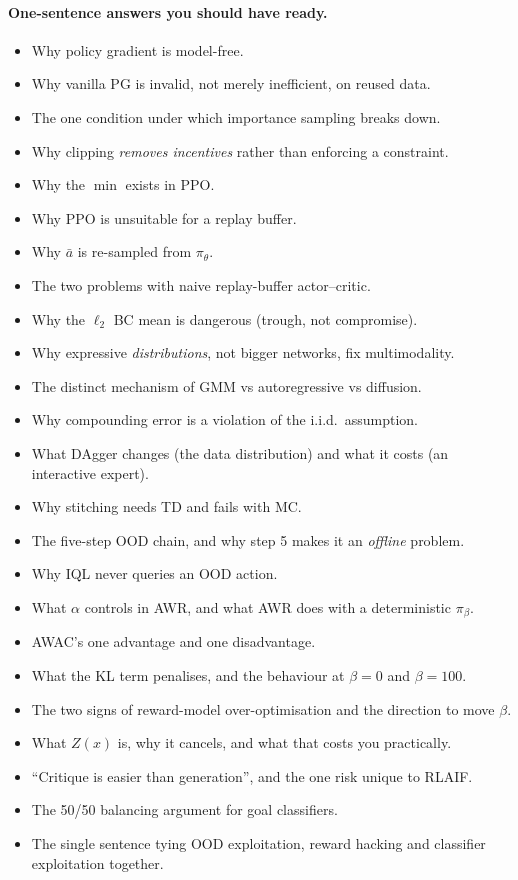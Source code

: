 \documentclass[11pt,a4paper]{article}
\begin{document}
\paragraph{One-sentence answers you should have ready.}
\begin{itemize}
\item[$\square$] Why policy gradient is model-free.
\item[$\square$] Why vanilla PG is invalid, not merely inefficient, on reused data.
\item[$\square$] The one condition under which importance sampling breaks down.
\item[$\square$] Why clipping \emph{removes incentives} rather than enforcing a constraint.
\item[$\square$] Why the $\min$ exists in PPO.
\item[$\square$] Why PPO is unsuitable for a replay buffer.
\item[$\square$] Why $\bar a$ is re-sampled from $\pi_\theta$.
\item[$\square$] The two problems with naive replay-buffer actor--critic.
\item[$\square$] Why the $\ell_2$ BC mean is dangerous (trough, not compromise).
\item[$\square$] Why expressive \emph{distributions}, not bigger networks, fix multimodality.
\item[$\square$] The distinct mechanism of GMM vs autoregressive vs diffusion.
\item[$\square$] Why compounding error is a violation of the i.i.d.\ assumption.
\item[$\square$] What DAgger changes (the data distribution) and what it costs (an interactive expert).
\item[$\square$] Why stitching needs TD and fails with MC.
\item[$\square$] The five-step OOD chain, and why step 5 makes it an \emph{offline} problem.
\item[$\square$] Why IQL never queries an OOD action.
\item[$\square$] What $\alpha$ controls in AWR, and what AWR does with a deterministic $\pi_\beta$.
\item[$\square$] AWAC's one advantage and one disadvantage.
\item[$\square$] What the KL term penalises, and the behaviour at $\beta=0$ and $\beta=100$.
\item[$\square$] The two signs of reward-model over-optimisation and the direction to move $\beta$.
\item[$\square$] What $Z(x)$ is, why it cancels, and what that costs you practically.
\item[$\square$] ``Critique is easier than generation'', and the one risk unique to RLAIF.
\item[$\square$] The 50/50 balancing argument for goal classifiers.
\item[$\square$] The single sentence tying OOD exploitation, reward hacking and classifier
exploitation together.
\end{itemize}
\end{document}
